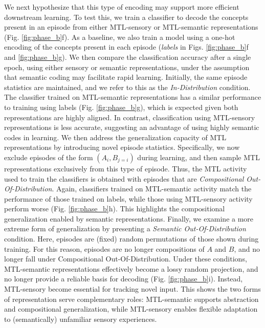 \documentclass{article}
\begin{document}
We next hypothesize that this type of encoding may support more efficient downstream learning. To test this, we train a classifier to decode the concepts present in an episode from either MTL-sensory or MTL-semantic representations (Fig. \ref{fig:phase_b}f). As a baseline, we also train a model using a one-hot encoding of the concepts present in each episode (\textit{labels} in Figs. \ref{fig:phase_b}f and \ref{fig:phase_b}g). We then compare the classification accuracy after a single epoch, using either sensory or semantic representations, under the assumption that semantic coding may facilitate rapid learning. Initially, the same episode statistics are maintained, and we refer to this as the \textit{In-Distribution} condition. The classifier trained on MTL-semantic representations has a similar performance to training using labels (Fig. \ref{fig:phase_b}g), which is expected given both representations are highly aligned. In contrast, classification using MTL-sensory representations is less accurate, suggesting an advantage of using highly semantic codes in learning.
\newline\newline
We then address the generalization capacity of MTL representations by introducing novel episode statistics. Specifically, we now exclude episodes of the form $(A_i, B_{j=i})$ during learning, and then sample MTL representations exclusively from this type of episode. Thus, the MTL activity used to train the classifiers is obtained with episodes that are \textit{Compositional Out-Of-Distribution}. Again, classifiers trained on MTL-semantic activity match the performance of those trained on labels, while those using MTL-sensory activity perform worse (Fig. \ref{fig:phase_b}h). This highlights the compositional generalization enabled by semantic representations.
\newline\newline
Finally, we examine a more extreme form of generalization by presenting a \textit{Semantic Out-Of-Distribution} condition. Here, episodes are (fixed) random permutations of those shown during training. For this reason, episodes are no longer compositions of $A$ and $B$, and no longer fall under Compositional Out-Of-Distribution. Under these conditions, MTL-semantic representations effectively become a lossy random projection, and no longer provide a reliable basis for decoding (Fig. \ref{fig:phase_b}i). Instead, MTL-sensory become essential for tracking novel input. This shows the two forms of representation serve complementary roles: MTL-semantic supports abstraction and compositional generalization, while MTL-sensory enables flexible adaptation to (semantically) unfamiliar sensory experiences.
\end{document}
